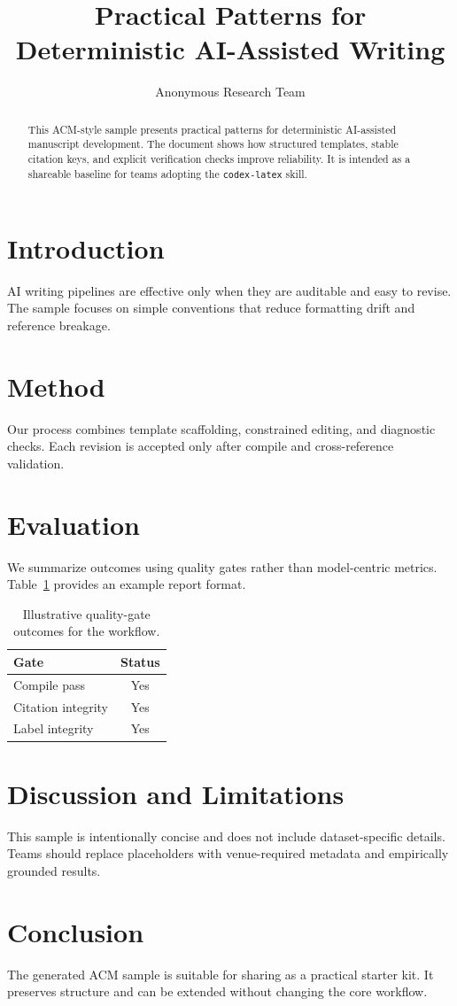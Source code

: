 \documentclass[sigconf]{acmart}
\title{Practical Patterns for Deterministic AI-Assisted Writing}
\author{Anonymous Research Team}
\affiliation{
  \institution{Institution Name}
  \city{City}
  \country{Country}
}
\begin{document}
\begin{abstract}
This ACM-style sample presents practical patterns for deterministic AI-assisted manuscript development.
The document shows how structured templates, stable citation keys, and explicit verification checks improve reliability.
It is intended as a shareable baseline for teams adopting the \texttt{codex-latex} skill.
\end{abstract}

\maketitle

\section{Introduction}
AI writing pipelines are effective only when they are auditable and easy to revise.
The sample focuses on simple conventions that reduce formatting drift and reference breakage.

\section{Method}
Our process combines template scaffolding, constrained editing, and diagnostic checks.
Each revision is accepted only after compile and cross-reference validation.

\section{Evaluation}
We summarize outcomes using quality gates rather than model-centric metrics.
Table~\ref{tab:acm-gates} provides an example report format.

\begin{table}[t]
  \centering
  \caption{Illustrative quality-gate outcomes for the workflow.}
  \label{tab:acm-gates}
  \begin{tabular}{lc}
    \toprule
    Gate & Status \\
    \midrule
    Compile pass & Yes \\
    Citation integrity & Yes \\
    Label integrity & Yes \\
    \bottomrule
  \end{tabular}
\end{table}

\section{Discussion and Limitations}
This sample is intentionally concise and does not include dataset-specific details.
Teams should replace placeholders with venue-required metadata and empirically grounded results.

\section{Conclusion}
The generated ACM sample is suitable for sharing as a practical starter kit.
It preserves structure and can be extended without changing the core workflow.



\end{document}
